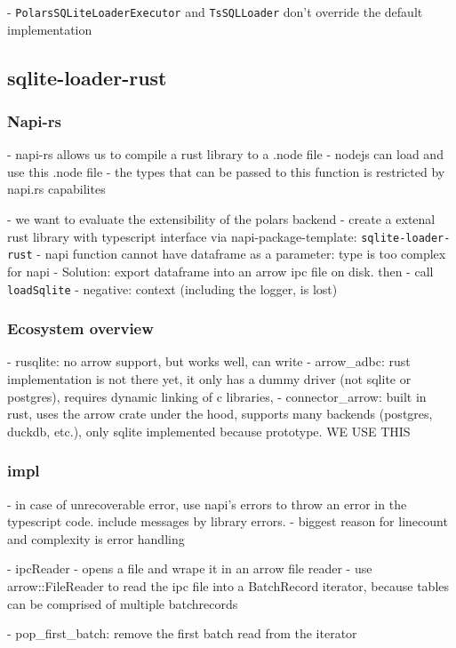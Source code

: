 - \Verb|PolarsSQLiteLoaderExecutor| and \Verb|TsSQLLoader| don't override the default implementation

\subsection{sqlite-loader-rust}
\label{subsection:sqlite-loader-rust}

\subsubsection{Napi-rs}
- napi-rs allows us to compile a rust library to a .node file
- nodejs can load and use this .node file
- the types that can be passed to this function is restricted by napi.rs capabilites

- we want to evaluate the extensibility of the polars backend
- create a extenal rust library with typescript interface via napi-package-template: \Verb|sqlite-loader-rust|
- napi function cannot have dataframe as a parameter: type is too complex for napi
- Solution: export dataframe into an arrow ipc file on disk. then
- call \Verb|loadSqlite|
- negative: context (including the logger, is lost)

\subsubsection{Ecosystem overview}
- rusqlite: no arrow support, but works well, can write
- arrow\_adbc: rust implementation is not there yet, it only has a dummy driver (not sqlite or postgres), requires dynamic linking of c libraries,
- connector\_arrow: built in rust, uses the arrow crate under the hood, supports many backends (postgres, duckdb, etc.), only sqlite implemented because prototype. WE USE THIS

\subsubsection{impl}
- in case of unrecoverable error, use napi's errors to throw an error in the typescript code. include messages by library errors.
- biggest reason for linecount and complexity is error handling

- ipcReader
- opens a file and wrape it in an arrow file reader
- use arrow::FileReader to read the ipc file into a BatchRecord iterator, because tables can be comprised of multiple batchrecords

- pop_first_batch: remove the first batch read from the iterator


